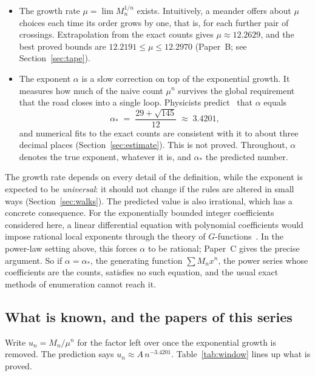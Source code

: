 \begin{itemize}
\item The growth rate $\mu=\lim M_n^{1/n}$ exists. Intuitively, a meander offers about $\mu$
choices each time its order grows by one, that is, for each further pair of crossings.
Extrapolation from the exact counts gives $\mu\approx 12.2629$, and the best proved bounds are
$12.2191\le\mu\le12.2970$ (Paper~B; see Section~\ref{sec:tape}).
\item The exponent $\alpha$ is a slow correction on top of the exponential growth. It measures
how much of the naive count $\mu^n$ survives the global requirement that the road closes into a
single loop. Physicists predict~\cite{DGG} that $\alpha$ equals
\begin{equation}\label{eq:alpha}
\alpha_* \;=\; \frac{29+\sqrt{145}}{12} \;\approx\; 3.4201,
\end{equation}
and numerical fits to the exact counts are consistent with it to about three decimal places
(Section~\ref{sec:estimate}). This is not proved. Throughout,
$\alpha$ denotes the true exponent, whatever it is, and $\alpha_*$ the predicted number.
\end{itemize}

The growth rate depends on every detail of the definition, while the exponent is expected to be
\emph{universal}: it should not change if the rules are altered in small ways
(Section~\ref{sec:walks}). The predicted value is also irrational, which has a concrete
consequence. For the exponentially bounded integer coefficients considered here, a linear differential equation
with polynomial coefficients would impose rational local exponents through the theory of
$G$-functions~\cite{Andre}. In the power-law setting above, this forces $\alpha$ to be rational;
Paper~C gives the precise argument. So if $\alpha=\alpha_*$, the generating function
$\sum M_n x^n$, the power series whose coefficients are the counts, satisfies no such equation,
and the usual exact methods of enumeration cannot reach it.

\subsection{What is known, and the papers of this series}

Write $u_n=M_n/\mu^n$ for the factor left over once the exponential growth is removed. The
prediction says $u_n\approx A\,n^{-3.4201}$. Table~\ref{tab:window} lines up what is proved.

